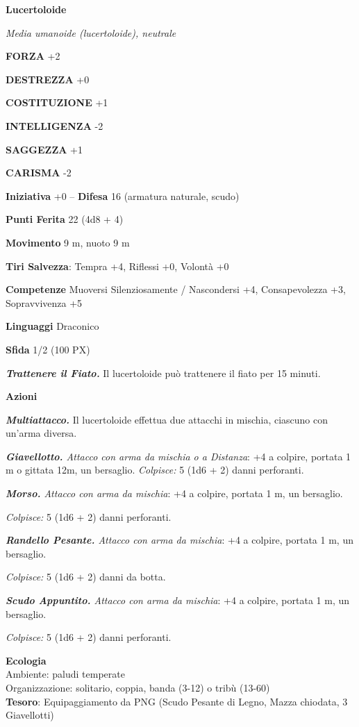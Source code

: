 \begin{multicols}{2}
\medskip{}\textbf{Lucertoloide}

\textit{Media umanoide (lucertoloide), neutrale}

\textbf{FORZA} +2

\textbf{DESTREZZA} +0

\textbf{COSTITUZIONE} +1

\textbf{INTELLIGENZA} -2

\textbf{SAGGEZZA} +1

\textbf{CARISMA} -2

\textbf{Iniziativa} +0 -- \textbf{Difesa} 16 (armatura naturale, scudo)

\textbf{Punti Ferita} 22 (4d8 + 4)

\textbf{Movimento} 9 m, nuoto 9 m

\textbf{Tiri Salvezza}: Tempra +4, Riflessi +0, Volontà +0

\textbf{Competenze} Muoversi Silenziosamente / Nascondersi +4, Consapevolezza +3, Sopravvivenza +5

\textbf{Linguaggi} Draconico

\textbf{Sfida} 1/2 (100 PX)

\textit{\textbf{Trattenere il Fiato.}} Il lucertoloide può trattenere il fiato per 15 minuti.

\textbf{Azioni}

\textit{\textbf{Multiattacco.}} Il lucertoloide effettua due attacchi in mischia, ciascuno con un'arma diversa.

\textit{\textbf{Giavellotto.} Attacco con arma da mischia o a Distanza}: +4 a colpire, portata 1 m o gittata 12m, un bersaglio. \textit{Colpisce:} 5 (1d6 + 2) danni perforanti.

\textit{\textbf{Morso.} Attacco con arma da mischia}: +4 a colpire, portata 1 m, un bersaglio.

\textit{Colpisce:} 5 (1d6 + 2) danni perforanti.

\textit{\textbf{Randello Pesante.} Attacco con arma da mischia}: +4 a colpire, portata 1 m, un bersaglio.

\textit{Colpisce:} 5 (1d6 + 2) danni da botta.

\textit{\textbf{Scudo Appuntito.} Attacco con arma da mischia}: +4 a colpire, portata 1 m, un bersaglio.

\textit{Colpisce:} 5 (1d6 + 2) danni perforanti.

\textbf{Ecologia}\\
Ambiente: paludi temperate\\
Organizzazione: solitario, coppia, banda (3-12) o tribù (13-60)\\
\textbf{Tesoro}: Equipaggiamento da PNG (Scudo Pesante di Legno, Mazza chiodata, 3 Giavellotti)\\


\end{multicols}
